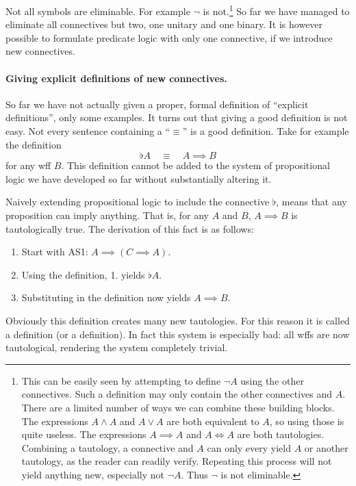 Not all symbols are eliminable. For example $\neg$ is not.\footnote{This can be easily seen by attempting to define $\neg A$ using the other connectives. Such a definition may only contain the other connectives and $A$. There are a limited number of ways we can combine these building blocks. The expressions $A \land A$ and $A \lor A$ are both equivalent to $A$, so using those is quite useless. The expressions $A \implies A$ and $A \iff A$ are both tautologies. Combining a tautology, a connective and $A$ can only every yield $A$ or another tautology, as the reader can readily verify. Repeating this process will not yield anything new, especially not $\neg A$. Thus $\neg$ is not eliminable.} So far we have managed to eliminate all connectives but two, one unitary and one binary. It is however possible to formulate predicate logic with only one connective, if we introduce new connectives.

\paragraph{Giving explicit definitions of new connectives.}
So far we have not actually given a proper, formal definition of ``explicit definitions'', only some examples. It turns out that giving a good definition is not easy. Not every sentence containing a ``$\equiv$'' is a good definition. Take for example the definition
\[ \flat A \quad\equiv\quad A \implies B \]
for any wff $B$. This definition cannot be added to the system of propositional logic we have developed so far without substantially altering it.
\begin{example}
Naively extending propositional logic to include the connective $\flat$, means that any proposition can imply anything. That is, for any $A$ and $B$, $A \implies B$ is tautologically true. The derivation of this fact is as follows:
\begin{enumerate}
\item Start with AS1: $A \implies (C\implies A)$.
\item Using the definition, 1. yields $\flat A$.
\item Substituting in the definition now yields $A \implies B$.
\end{enumerate}
\end{example}
Obviously this definition creates many new tautologies. For this reason it is called a  definition (or a  definition). In fact this system is especially bad: all wffs are now tautological, rendering the system completely trivial.

